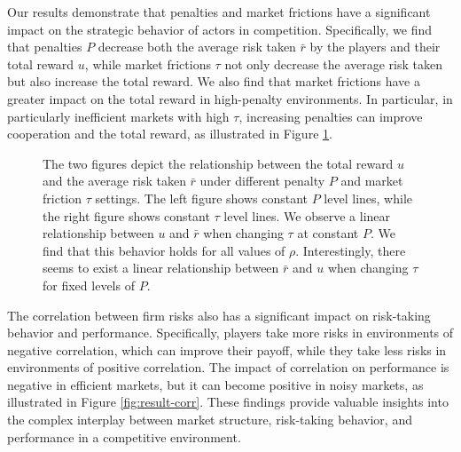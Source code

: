 \documentclass[preprint,12pt,authoryear]{elsarticle}
\theoremstyle{definition}
\begin{document}
Our results demonstrate that penalties and market frictions have a significant impact on the strategic behavior of actors in competition. Specifically, we find that penalties $P$ decrease both the average risk taken $\bar r$ by the players and their total reward $u$, while market frictions $\tau$ not only decrease the average risk taken but also increase the total reward. We also find that market frictions have a greater impact on the total reward in high-penalty environments. In particular, in particularly inefficient markets with high $\tau$, increasing penalties can improve cooperation and the total reward, as illustrated in Figure \ref{fig:result-noise}.

\begin{figure}[htbp]
  \centering
  \begin{minipage}[t]{0.48\textwidth}
    \centering
    
  \end{minipage}
  \hfill
  \begin{minipage}[t]{0.48\textwidth}
    \centering
    
  \end{minipage}
  \caption{
  The two figures depict the relationship between the total reward $u$ and the average risk taken $\bar r$ under different penalty $P$ and market friction $\tau$ settings. The left figure shows constant $P$ level lines, while the right figure shows constant $\tau$ level lines. We observe a linear relationship between $u$ and $\bar r$ when changing $\tau$ at constant $P$. We find that this behavior holds for all values of $\rho$. Interestingly, there seems to exist a linear relationship between $\bar r$ and $u$ when changing $\tau$ for fixed levels of $P$.}
  \label{fig:result-noise}  
\end{figure}

 The correlation between firm risks also has a significant impact on risk-taking behavior and performance. Specifically, players take more risks in environments of negative correlation, which can improve their payoff, while they take less risks in environments of positive correlation. The impact of correlation on performance is negative in efficient markets, but it can become positive in noisy markets, as illustrated in Figure \ref{fig:result-corr}. These findings provide valuable insights into the complex interplay between market structure, risk-taking behavior, and performance in a competitive environment.
\end{document}
